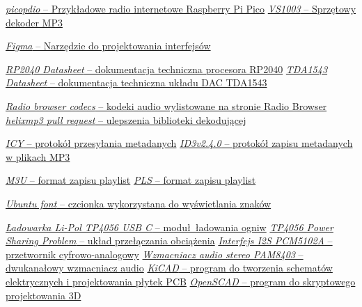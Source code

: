 \documentclass[polish]{aghengthesis}
\begin{document}
\begin{thebibliography}{9}
		\href{https://github.com/episource/picopdio}{\textit{picopdio} -- Przykładowe radio internetowe Raspberry Pi Pico}
		\href{https://botland.com.pl/odtwarzacze-mp3-wav-ogg-midi/14308-odtwarzacz-mp3-vs1003-z-mikrofonem-5903351241786.html}{\textit{VS1003} -- Sprzętowy dekoder MP3}
		
		\href{https://www.figma.com}{\textit{Figma} -- Narzędzie do projektowania interfejsów}
		
		\href{https://datasheets.raspberrypi.com/rp2040/rp2040-datasheet.pdf}{\textit{RP2040 Datasheet} -- dokumentacja techniczna procesora RP2040}
		\href{http://www.lampizator.eu/lampizator/LINKS%20AND%20DOWNLOADS/DATAMINING/tda%201543.pdf}{\textit{TDA1543 Datasheet} -- dokumentacja techniczna układu DAC TDA1543}
		
		\href{https://www.radio-browser.info/codecs}{\textit{Radio browser codecs} -- kodeki audio wylistowane na stronie Radio Browser}
		\href{https://github.com/ultraembedded/libhelix-mp3/pull/3}{\textit{helixmp3 pull request} -- ulepszenia biblioteki dekodującej}
		
		\href{https://gist.github.com/niko/2a1d7b2d109ebe7f7ca2f860c3505ef0#file-icy_meta-md}{\textit{ICY} -- protokół przesyłania metadanych}
		\href{https://mutagen-specs.readthedocs.io/en/latest/id3/id3v2.4.0-structure.html}{\textit{ID3v2.4.0} -- protokół zapisu metadanych w plikach MP3}
		
		\href{https://en.wikipedia.org/wiki/M3U}{\textit{M3U} -- format zapisu playlist}
		\href{https://en.wikipedia.org/wiki/PLS_(file_format)}{\textit{PLS} -- format zapisu playlist}
		
		\href{https://design.ubuntu.com/font}{\textit{Ubuntu font} -- czcionka wykorzystana do wyświetlania znaków}
		
		\href{https://botland.com.pl/moduly-ladowania-lipol-usb-micro-usb/16979-ladowarka-li-pol-tp4056-pojedyncza-cela-1s-37v-usb-typ-c-z-zabezpieczeniami--5904422326708.html}{\textit{Ładowarka Li-Pol TP4056 USB C} -- moduł ładowania ogniw}
		\href{https://www.best-microcontroller-projects.com/tp4056-page2.html}{\textit{TP4056 Power Sharing Problem} -- układ przełączania obciążenia}
		\href{https://www.aliexpress.com/item/1005002846127078.html}{\textit{Interfejs I2S PCM5102A} -- przetwornik cyfrowo-analogowy}
		\href{https://botland.com.pl/odtwarzacze-mp3-wav-ogg-midi/6641-wzmacniacz-audio-stereo-pam8403-5v-3w-dwukanalowy-zielony-5904422359850.html}{\textit{Wzmacniacz audio stereo PAM8403} -- dwukanałowy wzmacniacz audio}
		\href{https://www.kicad.org/}{\textit{KiCAD} -- program do tworzenia schematów elektrycznych i projektowania płytek PCB}
		\href{https://openscad.org/}{\textit{OpenSCAD} -- program do skryptowego projektowania 3D}
		

\end{thebibliography}
\end{document}
